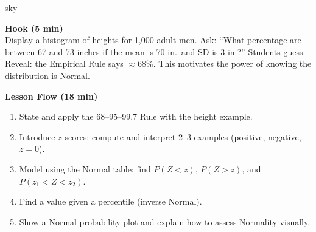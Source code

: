 \documentclass[10pt]{article}
\begin{document}
\begin{skillbox}{sky}
\begin{minipage}[t]{0.48\linewidth}
    \textbf{Hook (5 min)}\\
    Display a histogram of heights for 1{,}000 adult men. Ask: ``What percentage are between 67 and 73 inches if the mean is 70 in.\ and SD is 3 in.?'' Students guess. Reveal: the Empirical Rule says $\approx 68\%$. This motivates the power of knowing the distribution is Normal.
\end{minipage}
\hfill
\begin{minipage}[t]{0.48\linewidth}
    \textbf{Lesson Flow (18 min)}
    \begin{enumerate}
        \item State and apply the 68--95--99.7 Rule with the height example.
        \item Introduce $z$-scores; compute and interpret 2--3 examples (positive, negative, $z=0$).
        \item Model using the Normal table: find $P(Z < z)$, $P(Z > z)$, and $P(z_1 < Z < z_2)$.
        \item Find a value given a percentile (inverse Normal).
        \item Show a Normal probability plot and explain how to assess Normality visually.
    \end{enumerate}
\end{minipage}
\end{skillbox}
\end{document}
